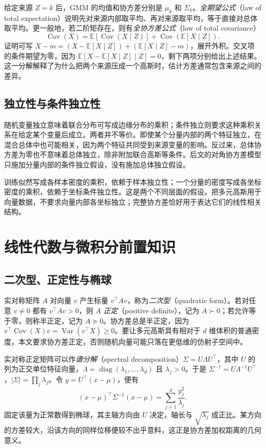 \documentclass[UTF8,12pt,a4paper,fontset=fandol]{ctexart}
\begin{document}
给定来源 $Z=k$ 后，GMM 的均值和协方差分别是 $\mu_k$ 和 $\Sigma_k$。\emph{全期望公式}（law of total expectation）说明先对来源内部取平均、再对来源取平均，等于直接对总体取平均。更一般地，若二阶矩存在，则有\emph{全协方差公式}（law of total covariance）
\begin{equation}
\operatorname{Cov}(X)=\mathbb E[\operatorname{Cov}(X\mid Z)]
+\operatorname{Cov}(\mathbb E[X\mid Z]).
\label{eq:gmm-total-covariance}
\end{equation}
证明可写 $X-m=(X-\mathbb E[X\mid Z])+(\mathbb E[X\mid Z]-m)$，展开外积。交叉项的条件期望为零，因为 $\mathbb E[X-\mathbb E[X\mid Z]\mid Z]=0$，剩下两项分别给出上述结果。这一分解解释了为什么把两个来源压成一个高斯时，估计方差通常包含来源之间的差异。

\subsection{独立性与条件独立性}
随机变量独立意味着联合分布可写成边缘分布的乘积；条件独立则要求这种乘积关系在给定某个变量后成立。两者并不等价。即使某个分量内部的两个特征独立，在混合总体中也可能相关，因为两个特征共同受到来源变量的影响。反过来，总体协方差为零也不意味着总体独立，除非附加联合高斯等条件。后文的对角协方差模型只施加分量内部的条件独立假设，没有施加总体独立假设。

训练似然写成各样本密度的乘积，依赖于样本独立性；一个分量的密度写成各坐标密度的乘积，依赖于坐标条件独立性。这是两个不同层面的假设。把多元高斯用于向量数据，不要求向量内部各坐标独立；完整协方差恰好用于表达它们的线性相关结构。

\section{线性代数与微积分前置知识}
\label{sec:gmm-linear-algebra}

\subsection{二次型、正定性与椭球}
实对称矩阵 $A$ 对向量 $v$ 产生标量 $v^\top Av$，称为\emph{二次型}（quadratic form）。若对任意 $v\neq0$ 都有 $v^\top Av>0$，则 $A$ \emph{正定}（positive definite），记为 $A\succ0$；若允许等于零，则称半正定，记为 $A\succeq0$。协方差总是半正定，因为 $v^\top\operatorname{Cov}(X)v=\operatorname{Var}(v^\top X)\geq0$。要让多元高斯具有相对于 $d$ 维体积的普通密度，本文要求协方差正定，否则随机向量可能只落在更低维的仿射子空间中。

实对称正定矩阵可以作\emph{谱分解}（spectral decomposition）$\Sigma=U\Lambda U^\top$，其中 $U$ 的列为正交单位特征向量，$\Lambda=\operatorname{diag}(\lambda_1,\ldots,\lambda_d)$ 且 $\lambda_j>0$。于是 $\Sigma^{-1}=U\Lambda^{-1}U^\top$，$|\Sigma|=\prod_j\lambda_j$。令 $y=U^\top(x-\mu)$，便有
\begin{equation}
(x-\mu)^\top\Sigma^{-1}(x-\mu)=\sum_{j=1}^d\frac{y_j^2}{\lambda_j}.
\label{eq:gmm-quadratic-form}
\end{equation}
固定该量为正常数得到椭球，其主轴方向由 $U$ 决定，轴长与 $\sqrt{\lambda_j}$ 成正比。某方向的方差较大，沿该方向的同样位移便较不出乎意料，这正是协方差加权距离的几何意义。
\end{document}
